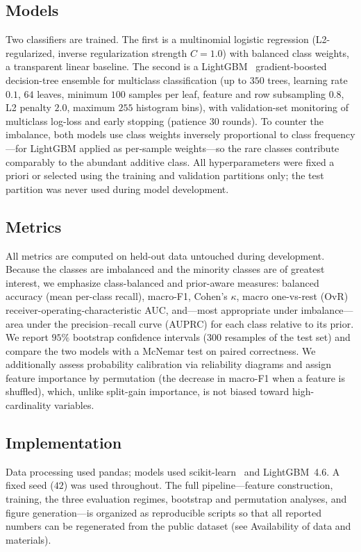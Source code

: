 \documentclass{bmcart}
\begin{document}
\subsection*{Models}
Two classifiers are trained. The first is a multinomial logistic regression (L2-regularized, inverse
regularization strength $C=1.0$) with balanced class weights, a transparent linear baseline. The second
is a LightGBM~\cite{ke2017} gradient-boosted decision-tree ensemble for multiclass classification (up
to $350$ trees, learning rate $0.1$, $64$ leaves, minimum $100$ samples per leaf, feature and row
subsampling $0.8$, L2 penalty $2.0$, maximum $255$ histogram bins), with validation-set monitoring of
multiclass log-loss and early stopping (patience $30$ rounds). To counter the imbalance, both models
use class weights inversely proportional to class frequency---for LightGBM applied as per-sample
weights---so the rare classes contribute comparably to the abundant additive class. All hyperparameters
were fixed a priori or selected using the training and validation partitions only; the test partition
was never used during model development.

\subsection*{Metrics}
All metrics are computed on held-out data untouched during development. Because the classes are
imbalanced and the minority classes are of greatest interest, we emphasize class-balanced and
prior-aware measures: balanced accuracy (mean per-class recall), macro-F1, Cohen's $\kappa$, macro
one-vs-rest (OvR) receiver-operating-characteristic AUC, and---most appropriate under imbalance---area
under the precision--recall curve (AUPRC) for each class relative to its prior. We report $95\%$
bootstrap confidence intervals ($300$ resamples of the test set) and compare the two models with a
McNemar test on paired correctness. We additionally assess probability calibration via reliability
diagrams and assign feature importance by permutation (the decrease in macro-F1 when a feature is
shuffled), which, unlike split-gain importance, is not biased toward high-cardinality variables.

\subsection*{Implementation}
Data processing used pandas; models used scikit-learn~\cite{pedregosa2011} and LightGBM~4.6. A fixed
seed ($42$) was used throughout. The full pipeline---feature construction, training, the three
evaluation regimes, bootstrap and permutation analyses, and figure generation---is organized as
reproducible scripts so that all reported numbers can be regenerated from the public dataset (see
Availability of data and materials).
\end{document}
